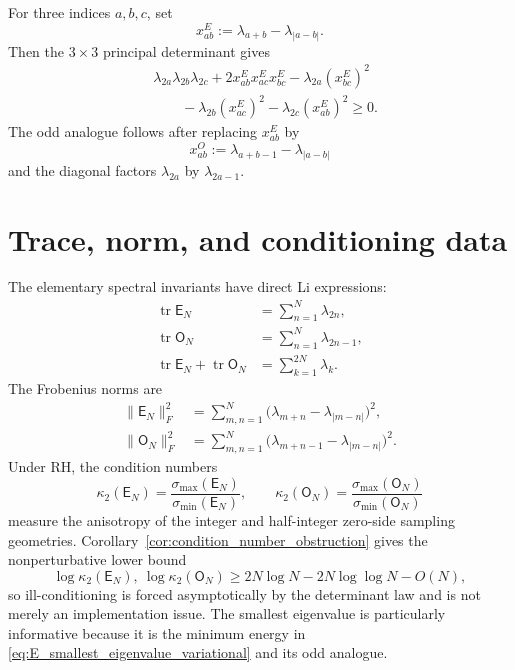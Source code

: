 \documentclass[11pt]{amsart}
\numberwithin{equation}{section}
\theoremstyle{plain}
\theoremstyle{definition}
\theoremstyle{remark}
\newcommand{\RH}{\mathrm{RH}}
\newcommand{\E}{\mathsf E}
\newcommand{\Omat}{\mathsf O}
\begin{document}
For three indices $a,b,c$, set
\begin{equation}
x_{ab}^E:=\lambda_{a+b}-\lambda_{|a-b|}.
\label{eq:xabE}
\end{equation}
Then the $3\times3$ principal determinant gives
\begin{equation}
\begin{aligned}
&\lambda_{2a}\lambda_{2b}\lambda_{2c}
+2x_{ab}^Ex_{ac}^Ex_{bc}^E
-\lambda_{2a}(x_{bc}^E)^2\\
&\qquad
-\lambda_{2b}(x_{ac}^E)^2
-\lambda_{2c}(x_{ab}^E)^2
\ge0.
\end{aligned}
\label{eq:E_3x3_inequality}
\end{equation}
The odd analogue follows after replacing $x_{ab}^E$ by
\begin{equation}
x_{ab}^O:=\lambda_{a+b-1}-\lambda_{|a-b|}
\label{eq:xabO}
\end{equation}
and the diagonal factors $\lambda_{2a}$ by $\lambda_{2a-1}$.

\section{Trace, norm, and conditioning data}
\label{sec:trace_conditioning}

The elementary spectral invariants have direct Li expressions:
\begin{align}
\operatorname{tr}\E_N
&=\sum_{n=1}^{N}\lambda_{2n},
\label{eq:E_trace}\\
\operatorname{tr}\Omat_N
&=\sum_{n=1}^{N}\lambda_{2n-1},
\label{eq:O_trace}\\
\operatorname{tr}\E_N+\operatorname{tr}\Omat_N
&=\sum_{k=1}^{2N}\lambda_k.
\label{eq:combined_trace}
\end{align}
The Frobenius norms are
\begin{align}
\|\E_N\|_F^2
&=\sum_{m,n=1}^{N}
\bigl(\lambda_{m+n}-\lambda_{|m-n|}\bigr)^2,
\label{eq:E_frobenius}\\
\|\Omat_N\|_F^2
&=\sum_{m,n=1}^{N}
\bigl(\lambda_{m+n-1}-\lambda_{|m-n|}\bigr)^2.
\label{eq:O_frobenius}
\end{align}
Under $\RH$, the condition numbers
\begin{equation}
\kappa_2(\E_N)=\frac{\sigma_{\max}(\E_N)}{\sigma_{\min}(\E_N)},
\qquad
\kappa_2(\Omat_N)=\frac{\sigma_{\max}(\Omat_N)}{\sigma_{\min}(\Omat_N)}
\label{eq:condition_numbers}
\end{equation}
measure the anisotropy of the integer and half-integer zero-side sampling geometries. Corollary~\ref{cor:condition_number_obstruction} gives the nonperturbative lower bound
\begin{equation}
\log\kappa_2(\E_N),\ \log\kappa_2(\Omat_N)
\ge 2N\log N-2N\log\log N-O(N),
\label{eq:conditioning_practical_bound}
\end{equation}
so ill-conditioning is forced asymptotically by the determinant law and is not merely an implementation issue. The smallest eigenvalue is particularly informative because it is the minimum energy in \eqref{eq:E_smallest_eigenvalue_variational} and its odd analogue.
\end{document}
